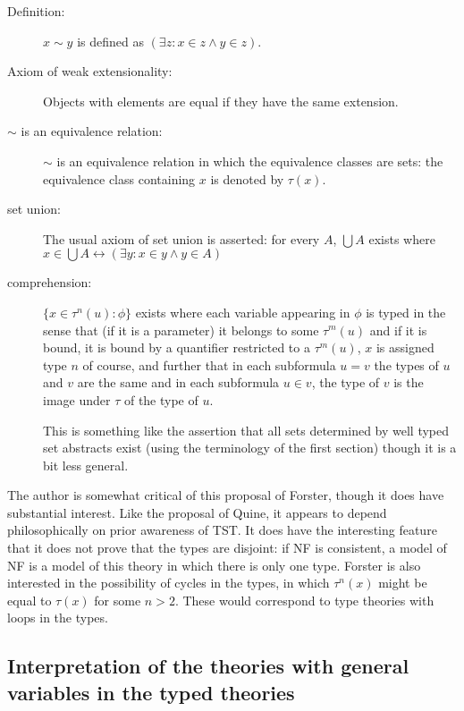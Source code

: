 \documentclass[12pt]{article}
\begin{document}
\begin{description}

\item[Definition:]  $x \sim y$ is defined as $(\exists z:x \in z \wedge y \in z)$.

\item[Axiom of weak extensionality:]  Objects with elements are equal if they have the same extension.

\item[$\sim$ is an equivalence relation:]  $\sim$ is an equivalence relation in which the equivalence classes are sets:  the equivalence class containing $x$ is denoted by $\tau(x)$.

\item[set union:]  The usual axiom of set union is asserted:  for every $A$, $\bigcup A$ exists where $x \in \bigcup A \leftrightarrow (\exists y:x \in y \wedge y \in A)$

\item[comprehension:]  $\{x \in \tau^n(u):\phi\}$ exists
where each variable appearing in $\phi$ is typed in the sense that
(if it is a parameter) it belongs to some $\tau^m(u)$ and if it is bound, it is bound by a quantifier restricted to a $\tau^m(u)$, $x$ is assigned type $n$ of course, and further that in each subformula $u=v$ the types of $u$ and $v$ are the same and in each subformula $u \in v$, the type of $v$ is the image under $\tau$ of the type of $u$.

This is something like the assertion that all sets determined by well typed set abstracts exist (using the terminology of the first section) though it is a bit less general.


\end{description}

The author is somewhat critical of this proposal of Forster, though it does have substantial interest.  Like the proposal of Quine, it appears to depend philosophically on prior awareness of TST.  It does have the interesting feature that it does not prove that the types are disjoint:  if NF is consistent, a model of NF is a model of this theory in which there is only one type.  Forster is also interested in the possibility of cycles in the types, in which $\tau^n(x)$ might be equal to $\tau(x)$ for some $n>2$.  These would correspond to type theories with loops in the types.

\subsection{Interpretation of the theories with general variables in the typed theories}
\end{document}
